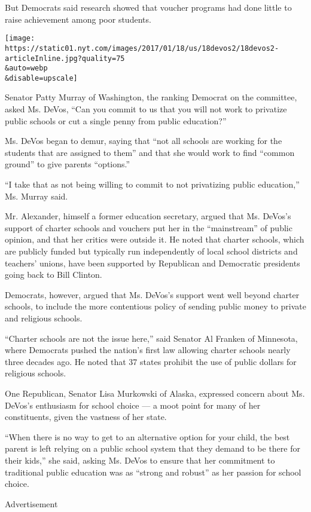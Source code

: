 But Democrats said research showed that voucher programs had done little
to raise achievement among poor students.

\texttt{[image: https://static01.nyt.com/images/2017/01/18/us/18devos2/18devos2-articleInline.jpg?quality=75\\\&auto=webp\\\&disable=upscale]}

Senator Patty Murray of Washington, the ranking Democrat on the
committee, asked Ms. DeVos, ``Can you commit to us that you will not
work to privatize public schools or cut a single penny from public
education?''

Ms. DeVos began to demur, saying that ``not all schools are working for
the students that are assigned to them'' and that she would work to find
``common ground'' to give parents ``options.''

``I take that as not being willing to commit to not privatizing public
education,'' Ms. Murray said.

Mr. Alexander, himself a former education secretary, argued that Ms.
DeVos's support of charter schools and vouchers put her in the
``mainstream'' of public opinion, and that her critics were outside it.
He noted that charter schools, which are publicly funded but typically
run independently of local school districts and teachers' unions, have
been supported by Republican and Democratic presidents going back to
Bill Clinton.

Democrats, however, argued that Ms. DeVos's support went well beyond
charter schools, to include the more contentious policy of sending
public money to private and religious schools.

``Charter schools are not the issue here,'' said Senator Al Franken of
Minnesota, where Democrats pushed the nation's first law allowing
charter schools nearly three decades ago. He noted that 37 states
prohibit the use of public dollars for religious schools.

One Republican, Senator Lisa Murkowski of Alaska, expressed concern
about Ms. DeVos's enthusiasm for school choice --- a moot point for many
of her constituents, given the vastness of her state.

``When there is no way to get to an alternative option for your child,
the best parent is left relying on a public school system that they
demand to be there for their kids,'' she said, asking Ms. DeVos to
ensure that her commitment to traditional public education was as
``strong and robust'' as her passion for school choice.

Advertisement

